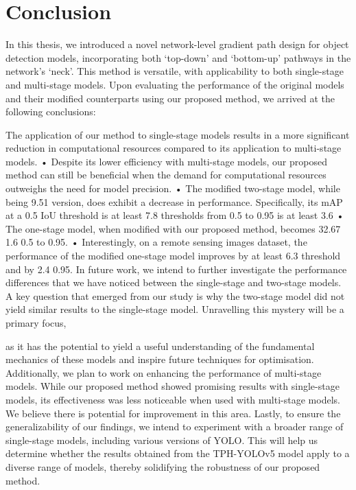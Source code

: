 \chapter{Conclusion}

In this thesis, we introduced a novel network-level gradient path design for object
detection models, incorporating both ‘top-down’ and ‘bottom-up’ pathways in the
network’s ‘neck’. This method is versatile, with applicability to both single-stage
and multi-stage models.
Upon evaluating the performance of the original models and their modified
counterparts using our proposed method, we arrived at the following
conclusions:


The application of our method to single-stage models results in a more
significant reduction in computational resources compared to its
application to multi-stage models.
• Despite its lower efficiency with multi-stage models, our proposed method
can still be beneficial when the demand for computational resources
outweighs the need for model precision.
• The modified two-stage model, while being 9.51%
version, does exhibit a decrease in performance. Specifically, its mAP at a
0.5 IoU threshold is at least 7.8%
thresholds from 0.5 to 0.95 is at least 3.6%
• The one-stage model, when modified with our proposed method, becomes
32.67%
1.6%
0.5 to 0.95.
• Interestingly, on a remote sensing images dataset, the performance of the
modified one-stage model improves by at least 6.3%
threshold and by 2.4%
0.95.
In future work, we intend to further investigate the performance differences that
we have noticed between the single-stage and two-stage models. A key question
that emerged from our study is why the two-stage model did not yield similar
results to the single-stage model. Unravelling this mystery will be a primary focus,


as it has the potential to yield a useful understanding of the fundamental
mechanics of these models and inspire future techniques for optimisation.
Additionally, we plan to work on enhancing the performance of multi-stage
models. While our proposed method showed promising results with single-stage
models, its effectiveness was less noticeable when used with multi-stage models.
We believe there is potential for improvement in this area.
Lastly, to ensure the generalizability of our findings, we intend to experiment with
a broader range of single-stage models, including various versions of YOLO. This
will help us determine whether the results obtained from the TPH-YOLOv5
model apply to a diverse range of models, thereby solidifying the robustness of
our proposed method.